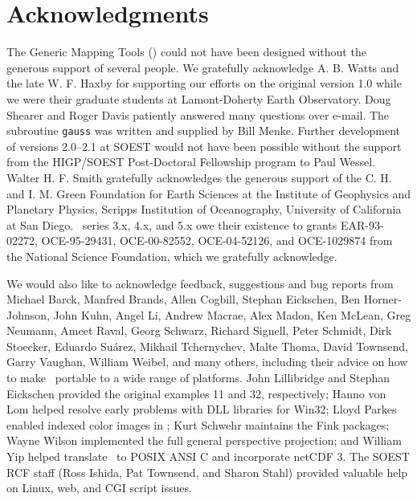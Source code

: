 %
%


\chapter*{Acknowledgments}

The Generic Mapping Tools (\GMT) could not have been designed without
the generous support of several people.  We gratefully acknowledge
A. B. Watts and the late W. F. Haxby for supporting our efforts on the original
version 1.0 while we were their graduate students at Lamont-Doherty
Earth Observatory.  Doug Shearer and Roger Davis patiently answered
many questions over e-mail.  The subroutine \texttt{gauss}
was written and supplied by Bill Menke.
Further development of versions 2.0--2.1 at SOEST would not have
been possible without the support from the HIGP/SOEST
Post-Doctoral Fellowship program to Paul Wessel.  Walter H. F. Smith
gratefully acknowledges the generous support of the C. H. and I. M.
Green Foundation for Earth Sciences at the Institute of Geophysics
and Planetary Physics, Scripps Institution of Oceanography, University
of California at San Diego.
\GMT\ series 3.x, 4.x, and 5.x owe their existence to grants
EAR-93-02272, OCE-95-29431, OCE-00-82552, OCE-04-52126, and OCE-1029874
from the National Science Foundation, which we gratefully acknowledge.

We would also like to acknowledge feedback, suggestions and bug reports
from
Michael Barck,
Manfred Brands,
Allen Cogbill,
Stephan Eickschen,
Ben Horner-Johnson,
John Kuhn,
Angel Li,
Andrew Macrae,
Alex Madon,
Ken McLean,
Greg Neumann,
Ameet Raval,
Georg Schwarz,
Richard Signell,
Peter Schmidt,
Dirk Stoecker,
Eduardo Su\'{a}rez,
Mikhail Tchernychev,
Malte Thoma,
David Townsend,
Garry Vaughan,
William Weibel,
and many others, including their advice
on how to make \GMT\ portable to a wide range of platforms.
John Lillibridge and Stephan Eickschen provided the original examples 11 and 32, respectively;
Hanno von Lom helped resolve early problems with DLL libraries for Win32;
Lloyd Parkes enabled indexed color images in \PS;
Kurt Schwehr maintains the \textsf{Fink} packages;
Wayne Wilson implemented the full general perspective projection;
and William Yip helped translate \GMT\ to POSIX ANSI C and incorporate netCDF 3.
The SOEST RCF staff (Ross Ishida, Pat Townsend, and Sharon Stahl) provided valuable help
on Linux, web, and CGI script issues.

